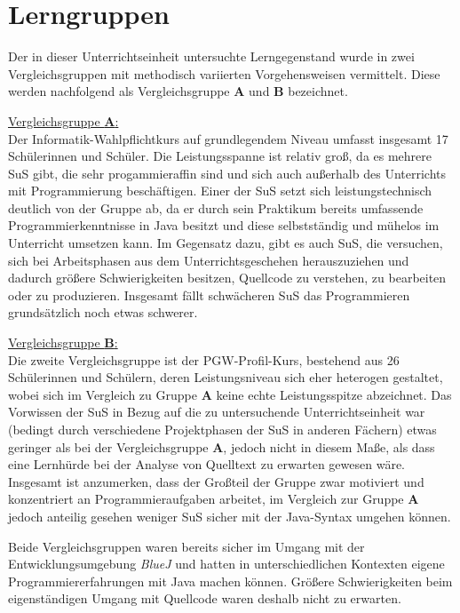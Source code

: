 \documentclass[paper=a4, DIV=13, BCOR=8mm, oneside=on, onecolumn=on, open = any, titlepage =on, parskip =half-, headsepline = on, footsepline = off, chapterprefix = on, sectionprefix = on, appendixprefix = off, fontsize = 12pt, numbers = noenddot, abstract = off]{scrreprt}
\begin{document}
\par \singlespacing
 \section{Lerngruppen}
\onehalfspacing
Der in dieser Unterrichtseinheit untersuchte Lerngegenstand wurde in zwei Vergleichsgruppen mit methodisch variierten Vorgehensweisen vermittelt. Diese werden nachfolgend als Vergleichsgruppe \textsc{\textbf{A}} und \textsc{\textbf{B}} bezeichnet.


\underline{Vergleichsgruppe \textsc{\textbf{A}}:}\\
Der Informatik-Wahlpflichtkurs auf grundlegendem Niveau umfasst insgesamt 17 Schülerinnen und Schüler. Die Leistungsspanne ist relativ groß, da es mehrere SuS gibt, die sehr progammieraffin sind und sich auch außerhalb des Unterrichts mit Programmierung beschäftigen. Einer der SuS setzt sich leistungstechnisch deutlich von der Gruppe ab, da er durch sein Praktikum bereits umfassende Programmierkenntnisse in Java besitzt und diese selbstständig und mühelos im Unterricht umsetzen kann. Im Gegensatz dazu, gibt es auch SuS, die versuchen, sich bei Arbeitsphasen aus dem Unterrichtsgeschehen herauszuziehen und dadurch größere Schwierigkeiten besitzen, Quellcode zu verstehen, zu bearbeiten oder zu produzieren. Insgesamt fällt schwächeren SuS das Programmieren grundsätzlich noch etwas schwerer.

\underline{Vergleichsgruppe \textsc{\textbf{B}}:}\\
Die zweite Vergleichsgruppe ist der PGW-Profil-Kurs, bestehend aus 26 Schülerinnen und Schülern, deren Leistungsniveau sich eher heterogen gestaltet, wobei sich im Vergleich zu Gruppe \textsc{\textbf{A}} keine echte Leistungsspitze abzeichnet. Das Vorwissen der SuS in Bezug auf die zu untersuchende Unterrichtseinheit war (bedingt durch verschiedene Projektphasen der SuS in anderen Fächern) etwas geringer als bei der Vergleichsgruppe \textsc{\textbf{A}}, jedoch nicht in diesem Maße, als dass eine Lernhürde bei der Analyse von Quelltext zu erwarten gewesen wäre. Insgesamt ist anzumerken, dass der Großteil der Gruppe zwar motiviert und konzentriert an Programmieraufgaben arbeitet, im Vergleich zur Gruppe \textsc{\textbf{A}} jedoch anteilig gesehen weniger SuS sicher mit der Java-Syntax umgehen können. 

Beide Vergleichsgruppen waren bereits sicher im Umgang mit der Entwicklungsumgebung \emph{BlueJ} und hatten in unterschiedlichen Kontexten eigene Programmiererfahrungen mit Java machen können. Größere Schwierigkeiten beim eigenständigen Umgang mit Quellcode waren deshalb nicht zu erwarten.
\end{document}
